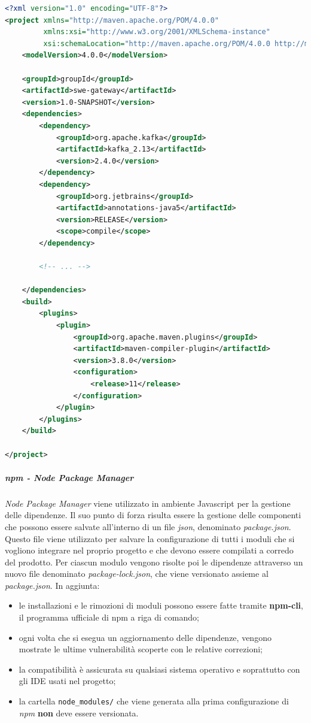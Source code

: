					\begin{lstlisting}[language=xml,captionpos=b,caption={Esempio di implementazione di un file pom.xml}]
<?xml version="1.0" encoding="UTF-8"?>
<project xmlns="http://maven.apache.org/POM/4.0.0"
         xmlns:xsi="http://www.w3.org/2001/XMLSchema-instance"
         xsi:schemaLocation="http://maven.apache.org/POM/4.0.0 http://maven.apache.org/xsd/maven-4.0.0.xsd">
    <modelVersion>4.0.0</modelVersion>

    <groupId>groupId</groupId>
    <artifactId>swe-gateway</artifactId>
    <version>1.0-SNAPSHOT</version>
    <dependencies>
        <dependency>
            <groupId>org.apache.kafka</groupId>
            <artifactId>kafka_2.13</artifactId>
            <version>2.4.0</version>
        </dependency>
        <dependency>
            <groupId>org.jetbrains</groupId>
            <artifactId>annotations-java5</artifactId>
            <version>RELEASE</version>
            <scope>compile</scope>
        </dependency>

        <!-- ... -->

    </dependencies>
    <build>
        <plugins>
            <plugin>
                <groupId>org.apache.maven.plugins</groupId>
                <artifactId>maven-compiler-plugin</artifactId>
                <version>3.8.0</version>
                <configuration>
                    <release>11</release>
                </configuration>
            </plugin>
        </plugins>
    </build>

</project>\end{lstlisting}

	\subparagraph{npm - Node Package Manager}

	\textit{Node Package Manager} viene utilizzato in ambiente Javascript per la gestione delle dipendenze. Il suo punto di forza risulta essere la gestione delle componenti che possono essere salvate all'interno di un file \textit{json}, denominato \textit{package.json}. Questo file viene utilizzato per salvare la configurazione di tutti i moduli che si vogliono integrare nel proprio progetto e che devono essere compilati a corredo del prodotto.
	Per ciascun modulo vengono risolte poi le dipendenze attraverso un nuovo file denominato \textit{package-lock.json}, che viene versionato assieme al \textit{package.json}. In aggiunta:
	\begin{itemize}
		\item le installazioni e le rimozioni di moduli possono essere fatte tramite \textbf{npm-cli}, il programma ufficiale di npm a riga di comando;
		\item ogni volta che si esegua un aggiornamento delle dipendenze, vengono mostrate le ultime vulnerabilità scoperte con le relative correzioni;
		\item la compatibilità è assicurata su qualsiasi sistema operativo e soprattutto con gli IDE usati nel progetto;
		\item la cartella \verb!node_modules/! che viene generata alla prima configurazione di \textit{npm} \textbf{non} deve essere versionata.
	\end{itemize}

